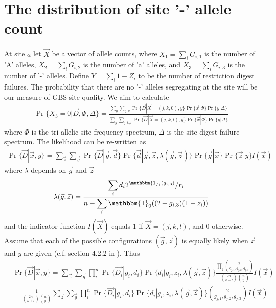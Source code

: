 \documentclass{article}
\begin{document}
\section{The distribution of site '-' allele count}
At site $a$ let $\vec{X}$ be a vector of allele counts, where $X_1 = \sum_{i} G_{i,1}$ is the number of 'A' alleles, $X_2 = \sum_{i} G_{i,2}$ is the number of 'a' alleles, and $X_3 = \sum_{i} G_{i,3}$ is the number of '-' alleles. Define $Y = \sum_{i} 1 - Z_{i}$ to be the number of restriction digest failures. The probability that there are no '-' alleles segregating at the site will be our measure of GBS site quality. We aim to calculate
\begin{align} \label{eq:x3dist}
\Pr\{X_3 = 0 | \vec{D}, \Phi, \Delta \} = \frac{\sum_{y} \sum_{j, k} \Pr\{\vec{D} | \vec{X} = (j, k, 0), y\} \Pr\{\vec{x} | \Phi\} \Pr\{y | \Delta\}} {\sum_{y} \sum_{j, k, l} \Pr\{\vec{D} | \vec{X} = (j, k, l), y\} \Pr\{\vec{x}   | \Phi\} \Pr\{y | \Delta\}}
\end{align}
where $\Phi$ is the tri-allelic site frequency spectrum, $\Delta$ is the site digest failure spectrum. The likelihood can be re-written as
\begin{align*}
\Pr\{\vec{D} | \vec{x}, y\} = \sum_{\vec{z}} \sum_{\vec{g}} \Pr\{\vec{D} | \vec{g}, \vec{d}\} \Pr\{\vec{d} | \vec{g}, \vec{z}, \lambda(\vec{g}, \vec{z}) \} \Pr\{\vec{g} | \vec{x}\} \Pr\{\vec{z} | y\} I(\vec{x})
\end{align*}
where $\lambda$ depends on $\vec{g}$ and $\vec{z}$
\begin{align} \label{eq:lambda}
\lambda(\vec{g}, \vec{z}) = \frac{\displaystyle{\sum_{i} d_i 2^{\mathbbm{1}_1(g_{i,3})} / r_i}} {\displaystyle{n - \sum_{i} \mathbbm{1}_0((2 - g_{i,3}) (1 - z_i))}}
\end{align}
and the indicator function $I(\vec{X})$ equals 1 if $\vec{X} = (j, k, l)$, and $0$ otherwise. Assume that each of the possible configurations $(\vec{g}, \vec{z})$ is equally likely when $\vec{x}$ and $y$ are given (c.f. section 4.2.2 in \cite{samtoolsnotes}). Thus
\begin{align*} 
&\Pr\{\vec{D} | \vec{x}, y\} = \sum_{\vec{z}} \sum_{\vec{g}} \prod_{i}^{n} \Pr\{\vec{D_i} | g_i, d_i\} \Pr\{d_i | g_i, z_i, \lambda(\vec{g}, \vec{z}) \} \frac{\prod_{j} \binom{2}{g_{j,1}, g_{j,2}, g_{j,3}}} {\binom{2n}{k + l} \binom{n}{y}} I(\vec{x})
\end{align*}
\begin{align} \label{eq:PrD}
&= \frac{1} {\binom{2n}{k + l} \binom{n}{y}} \sum_{\vec{z}} \sum_{\vec{g}} \prod_{i}^{n} \Pr\{\vec{D_i} | g_i, d_i\} \Pr\{d_i | g_i, z_i, \lambda(\vec{g}, \vec{z}) \} \binom{2}{g_{j,1}, g_{j,2}, g_{j,3}} I(\vec{x})
\end{align}
\end{document}
